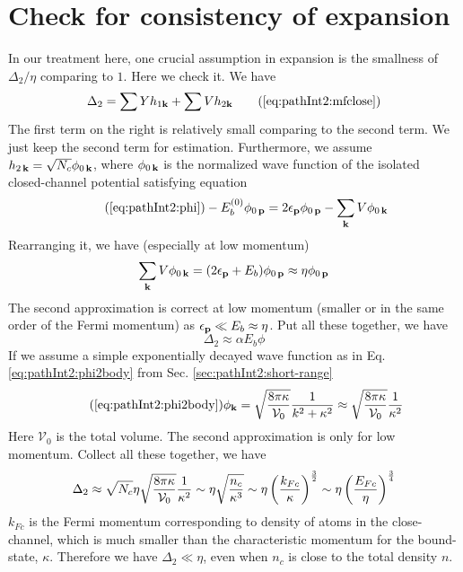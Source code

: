 \section{Check for consistency of expansion\label{sec:pathApp:consistency}}
In our treatment here, one crucial assumption in expansion is the smallness of $\Delta_{2}/\eta$ comparing to $1$.  Here we check it.  We have 
\begin{equation}
\Delta_{2}=\sum{}Yh_{1\vk}+\sum{}Vh_{2\vk}\tag{\ref{eq:pathInt2:mfclose}}
\end{equation}
The first term on the right is relatively small comparing to the second term.  We just keep the second term for estimation.  Furthermore,  we assume $h_{2\,\mathbf{k}}=\sqrt{N_{c}}\phi_{0\,\mathbf{k}}$, where $\phi_{0\,\mathbf{k}}$ is the normalized wave function of the  isolated closed-channel potential satisfying \sch equation
\begin{equation}\tag{\ref{eq:pathInt2:phi}}
-E_{b}^{(0)}\phi_{0\,\vp}=2\epsilon_{\vp}\phi_{0\,\vp}-\sum_{\vk}V \phi_{0\,\vk}
\end{equation}
Rearranging it, we have (especially at low momentum)
\begin{equation*}
\sum_{\mathbf{k}}V \phi_{0\,\mathbf{k}}=(2\epsilon_{\mathbf{p}}+E_{b})\phi_{0\,\mathbf{p}}\approx{\eta}\phi_{0\,\mathbf{p}}
\end{equation*}
The second approximation is correct at low momentum (smaller or in the same order of the Fermi momentum) as $\epsilon_{\mathbf{p}}\ll{}E_{b}\approx\eta$.  Put all these together, we have
\begin{equation*}
\Delta_{2}\approx\alpha{}E_{b}\phi
\end{equation*}
If we assume a simple exponentially decayed wave function as in Eq. \ref{eq:pathInt2:phi2body} from Sec. \ref{sec:pathInt2:short-range}
\begin{equation}\tag{\ref{eq:pathInt2:phi2body}}
\phi_{\vk}=\sqrt{\frac{8\pi\kappa}{\mathcal{V}_{0}}}\frac{1}{k^{2}+\kappa^{2}}\approx\sqrt{\frac{8\pi\kappa}{\mathcal{V}_{0}}}\frac{1}{\kappa^{2}}
\end{equation}
Here  $\mathcal{V}_{0}$ is the total volume.  The second approximation is only for  low momentum.  Collect all these together, we have
\begin{equation}
\Delta_{2}\approx\sqrt{N_{c}}\eta\sqrt{\frac{8\pi\kappa}{\mathcal{V}_{0}}}\frac{1}{\kappa^{2}}
\sim\eta\sqrt\frac{n_{c}}{\kappa^{3}}
\sim\eta\left(\frac{k_{Fc}}{\kappa}\right)^{\frac{3}{2}}
\sim\eta\left(\frac{E_{Fc}}{\eta}\right)^{\frac{3}{4}}
\end{equation}
$k_{Fc}$ is the Fermi momentum corresponding to density of atoms in the close-channel, which is much smaller than the characteristic momentum for the bound-state, $\kappa$.   Therefore we have $\Delta_{2}\ll\eta$, even when $n_{c}$ is close to the total density $n$. 

